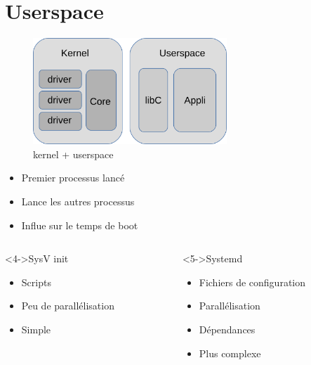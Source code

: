 \section{Userspace}
	\begin{frame}
		\begin{figure}
		\includegraphics[height=4cm]{img/arch_linux_full.png}
		\caption{kernel + userspace}
		\end{figure}
	\end{frame}
	\begin{frame}
		\begin{itemize}
			\item<1-> Premier processus lancé
			\item<2-> Lance les autres processus
			\item<3-> Influe sur le temps de boot
		\end{itemize}
		\begin{columns}[t]
			\begin{column}{0.48\textwidth}
				\begin{block}<4->{SysV init}
					\begin{itemize}
						\item Scripts
						\item Peu de parallélisation
						\item Simple
					\end{itemize}
				\end{block}
			\end{column}
			\begin{column}{0.48\textwidth}
				\begin{block}<5->{Systemd}
					\begin{itemize}
						\item Fichiers de configuration
						\item Parallélisation
						\item Dépendances
						\item Plus complexe
					\end{itemize}
				\end{block}
			\end{column}
		\end{columns}
	\end{frame}

